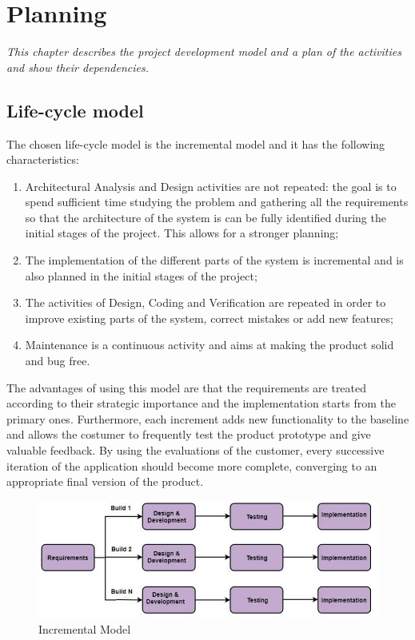 \newpage
\chapter{Planning}

\textsl{This chapter describes the project development model and a plan of the activities and show their dependencies.}

\section{Life-cycle model}

The chosen life-cycle model is the incremental model and it has the following characteristics:

\begin{enumerate}  
	\item Architectural Analysis and Design activities are not repeated: the goal is to spend sufficient time studying the problem and gathering all the requirements so that the architecture of the system is can be fully identified during the initial stages of the project. This allows for a stronger planning;
	\item The implementation of the different parts of the system is incremental and is also planned in the initial stages of the project;
	\item The activities of Design, Coding and Verification are repeated in order to improve existing parts of the system, correct mistakes or add new features;
	\item Maintenance is a continuous activity and aims at making the product solid and bug free.
\end{enumerate}

The advantages of using this model are that the requirements are treated according to their strategic importance and the implementation starts from the primary ones. Furthermore, each increment adds new functionality to the baseline and allows the costumer to frequently test the product prototype and give valuable feedback. By using the evaluations of the customer, every successive iteration of the application should become more complete, converging to an appropriate final version of the product.


\begin{figure}[H]
	\centering
	\includegraphics[scale=0.8]{img/incremental.jpg}
	\caption{Incremental Model}
\end{figure} 



